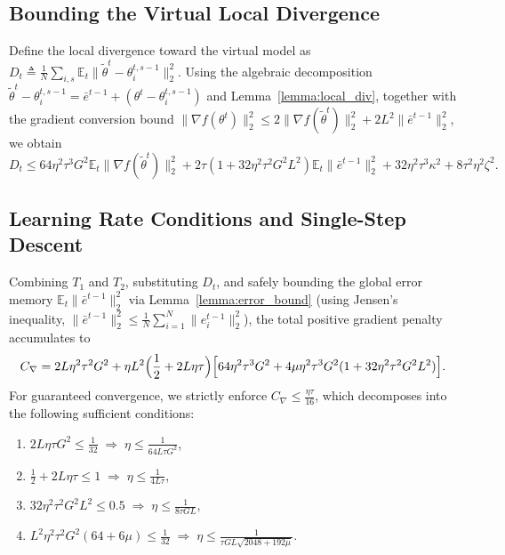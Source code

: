 \documentclass[conference]{IEEEtran}
\begin{document}
\subsection{Bounding the Virtual Local Divergence}
Define the local divergence toward the virtual model as $D_t \triangleq \frac{1}{N}\sum_{i,s}\mathbb{E}_t\|\tilde{\theta}^t - \theta_i^{t,s-1}\|_2^2$.
Using the algebraic decomposition $\tilde{\theta}^t - \theta_i^{t,s-1} = \bar{e}^{t-1} + (\theta^t - \theta_i^{t,s-1})$ and Lemma~\ref{lemma:local_div}, together with the gradient conversion bound $\|\nabla f(\theta^t)\|_2^2 \le 2\|\nabla f(\tilde{\theta}^t)\|_2^2 + 2L^2\|\bar{e}^{t-1}\|_2^2$, we obtain
\begin{equation} \label{eqn:psi_bound}
    D_t \le 64\eta^2\tau^3G^2 \mathbb{E}_t\|\nabla f(\tilde{\theta}^t)\|_2^2 + 2\tau(1+32\eta^2\tau^2G^2 L^2) \mathbb{E}_t\|\bar{e}^{t-1}\|_2^2 + 32\eta^2\tau^3\kappa^2 + 8\tau^2\eta^2\zeta^2.
\end{equation}

\subsection{Learning Rate Conditions and Single-Step Descent}
Combining $T_1$ and $T_2$, substituting $D_t$, and safely bounding the global error memory $\mathbb{E}_t\|\bar{e}^{t-1}\|_2^2$ via Lemma~\ref{lemma:error_bound} (using Jensen's inequality, $\|\bar{e}^{t-1}\|_2^2 \le \frac{1}{N}\sum_{i=1}^N \|e_i^{t-1}\|_2^2$), the total positive gradient penalty accumulates to
\begin{equation}
    C_{\nabla} = 2L\eta^2\tau^2G^2 + \eta L^2\Bigl(\frac12 + 2L\eta\tau\Bigr)\Bigl[64\eta^2\tau^3G^2 + 4\mu\eta^2\tau^3G^2(1+32\eta^2\tau^2G^2 L^2)\Bigr].
\end{equation}
For guaranteed convergence, we strictly enforce $C_{\nabla} \le \frac{\eta\tau}{16}$, which decomposes into the following sufficient conditions:
\begin{enumerate}
    \item $2L\eta\tau G^2 \le \frac{1}{32} \;\Rightarrow\; \eta \le \frac{1}{64L\tau G^2}$,
    \item $\frac12 + 2L\eta\tau \le 1 \;\Rightarrow\; \eta \le \frac{1}{4L\tau}$,
    \item $32\eta^2\tau^2G^2 L^2 \le 0.5 \;\Rightarrow\; \eta \le \frac{1}{8\tau G L}$,
    \item $L^2\eta^2\tau^2G^2(64 + 6\mu) \le \frac{1}{32} \;\Rightarrow\; \eta \le \frac{1}{\tau G L\sqrt{2048+192\mu}}$.
\end{enumerate}
\end{document}
